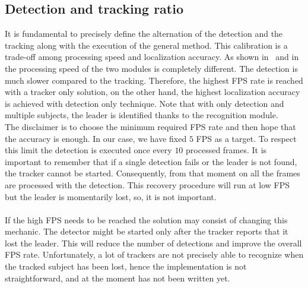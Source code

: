 \subsection{Detection and tracking ratio} \label{sec:ratioDetectTrack}
It is fundamental to precisely define the alternation of the detection and the tracking along with the execution of the general method. This calibration is a trade-off among processing speed and localization accuracy. As shown in~ and in~ the processing speed of the two modules is completely different. The detection is much slower compared to the tracking. Therefore, the highest FPS rate is reached with a tracker only solution, on the other hand, the highest localization accuracy is achieved with detection only technique. Note that with only detection and multiple subjects, the leader is identified thanks to the recognition module.\\
The disclaimer is to choose the minimum required FPS rate and then hope that the accuracy is enough. In our case, we have fixed $5$ FPS as a target. To respect this limit the detection is executed once every $10$ processed frames. It is important to remember that if a single detection fails or the leader is not found, the tracker cannot be started. Consequently, from that moment on all the frames are processed with the detection. This recovery procedure will run at low FPS but the leader is momentarily lost, so, it is not important.\\
\\
If the high FPS needs to be reached the solution may consist of changing this mechanic. The detector might be started only after the tracker reports that it lost the leader. This will reduce the number of detections and improve the overall FPS rate. Unfortunately, a lot of trackers are not precisely able to recognize when the tracked subject has been lost, hence the implementation is not straightforward, and at the moment has not been written yet.


